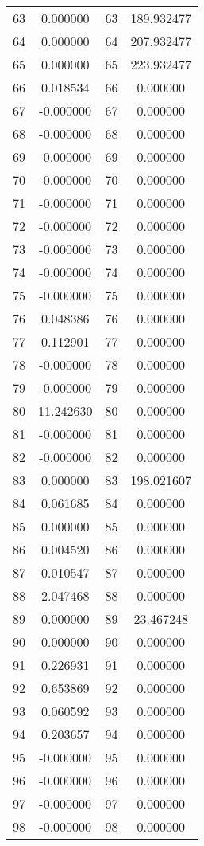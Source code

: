 \documentclass[12pt]{article}
\begin{document}
\begin{longtable}{@{}cccc@{}}
63 & 0.000000 & 63 & 189.932477 \\
64 & 0.000000 & 64 & 207.932477 \\
65 & 0.000000 & 65 & 223.932477 \\
66 & 0.018534 & 66 & 0.000000 \\
67 & -0.000000 & 67 & 0.000000 \\
68 & -0.000000 & 68 & 0.000000 \\
69 & -0.000000 & 69 & 0.000000 \\
70 & -0.000000 & 70 & 0.000000 \\
71 & -0.000000 & 71 & 0.000000 \\
72 & -0.000000 & 72 & 0.000000 \\
73 & -0.000000 & 73 & 0.000000 \\
74 & -0.000000 & 74 & 0.000000 \\
75 & -0.000000 & 75 & 0.000000 \\
76 & 0.048386 & 76 & 0.000000 \\
77 & 0.112901 & 77 & 0.000000 \\
78 & -0.000000 & 78 & 0.000000 \\
79 & -0.000000 & 79 & 0.000000 \\
80 & 11.242630 & 80 & 0.000000 \\
81 & -0.000000 & 81 & 0.000000 \\
82 & -0.000000 & 82 & 0.000000 \\
83 & 0.000000 & 83 & 198.021607 \\
84 & 0.061685 & 84 & 0.000000 \\
85 & 0.000000 & 85 & 0.000000 \\
86 & 0.004520 & 86 & 0.000000 \\
87 & 0.010547 & 87 & 0.000000 \\
88 & 2.047468 & 88 & 0.000000 \\
89 & 0.000000 & 89 & 23.467248 \\
90 & 0.000000 & 90 & 0.000000 \\
91 & 0.226931 & 91 & 0.000000 \\
92 & 0.653869 & 92 & 0.000000 \\
93 & 0.060592 & 93 & 0.000000 \\
94 & 0.203657 & 94 & 0.000000 \\
95 & -0.000000 & 95 & 0.000000 \\
96 & -0.000000 & 96 & 0.000000 \\
97 & -0.000000 & 97 & 0.000000 \\
98 & -0.000000 & 98 & 0.000000 \\

\end{longtable}
\end{document}
